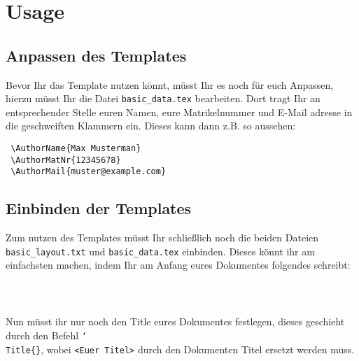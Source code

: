 


\lstset{language=TeX}

\fancyhf[HC]{}
\author{
	\getAuthorName\\
	Email: \textit{\href{mailto:\getAuthorMail}{\getAuthorMail}}\\\\
}



\maketitle %
\tableofcontents %

\newpage %

\section{Usage}
\subsection{Anpassen des Templates}
Bevor Ihr das Template nutzen könnt, müsst Ihr es noch für euch Anpassen, hierzu müsst Ihr die Datei \texttt{basic\_data.tex} bearbeiten. Dort tragt Ihr an entsprechender Stelle euren Namen, eure Matrikelnummer und E-Mail adresse in die geschweiften Klammern ein. Dieses kann dann z.B. so aussehen:
\begin{lstlisting}
 \AuthorName{Max Musterman}
 \AuthorMatNr{12345678}
 \AuthorMail{muster@example.com}
\end{lstlisting}

\subsection{Einbinden der Templates}
Zum nutzen des Templates müsst Ihr schließlich noch die beiden Dateien \texttt{basic\_layout.txt} und \texttt{basic\_data.tex} einbinden.
Dieses könnt ihr am einfachsten machen, indem Ihr am Anfang eures Dokumentes folgendes schreibt:
\begin{lstlisting}
 
 
\end{lstlisting}

Nun müsst ihr nur noch den Title eures Dokumentes festlegen, dieses geschieht durch den Befehl \texttt{\char`\\Title\{<Euer Titel>\}}, wobei \texttt{<Euer Titel>} durch den Dokumenten Titel ersetzt werden muss.

